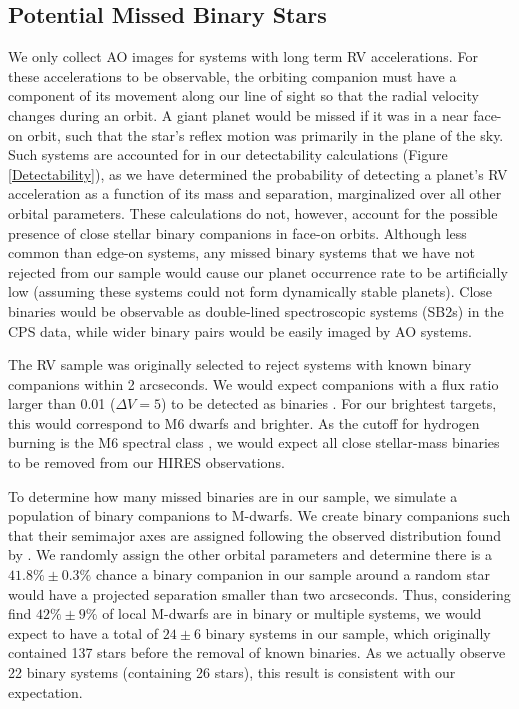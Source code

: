 \subsection{Potential Missed Binary Stars}
\label{PMBS}
We only collect AO images for systems with long term RV accelerations. For these accelerations to be observable, the orbiting companion must have a component of its movement along our line of sight so that the radial velocity changes during an orbit. A giant planet would be missed if it was in a near face-on orbit, such that the star's reflex motion was primarily in the plane of the sky. Such systems are accounted for in our detectability calculations (Figure \ref{Detectability}), as we have determined the probability of detecting a planet's RV acceleration as a function of its mass and separation, marginalized over all other orbital parameters. These calculations do not, however, account for the possible presence of close stellar binary companions in face-on orbits. Although less common than edge-on systems, any missed binary systems that we have not rejected from our sample would cause our planet occurrence rate to be artificially low (assuming these systems could not form dynamically stable planets). Close binaries would be observable as double-lined spectroscopic systems (SB2s) in the CPS data, while wider binary pairs would be easily imaged by AO systems.

The RV sample was originally selected to reject systems with known binary companions within 2 arcseconds. We would expect companions with a flux ratio larger than 0.01 ($\Delta V = 5$) to be detected as binaries \citep{Robinson07}. For our brightest targets, this would correspond to M6 dwarfs and brighter. As the cutoff for hydrogen burning is the M6 spectral class \citep{Luhman12}, we would expect all close stellar-mass binaries to be removed from our HIRES observations. 

To determine how many missed binaries are in our sample, we simulate a population of binary companions to M-dwarfs. We create binary companions such that their semimajor axes are assigned following the observed distribution found by \citet{Fischer92}. We randomly assign the other orbital parameters and determine there is a $41.8\% \pm 0.3\%$ chance a binary companion in our sample around a random star would have a projected separation smaller than two arcseconds. Thus, considering \citet{Fischer92} find $42\% \pm 9\%$ of local M-dwarfs are in binary or multiple systems, we would expect to have a total of $24 \pm 6$ binary systems in our sample, which originally contained 137 stars before the removal of known binaries. As we actually observe 22 binary systems (containing 26 stars), this result is consistent with our expectation.

